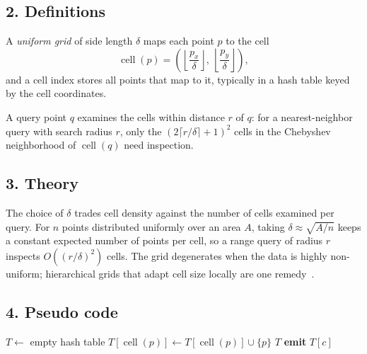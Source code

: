 \subsection{2. Definitions}

\begin{definition}\label{def:uniform_grid}
A \emph{uniform grid} of side length $\delta$ maps each point $p$ to the cell
\[
\operatorname{cell}(p) = \left( \left\lfloor \frac{p_x}{\delta} \right\rfloor,\ \left\lfloor \frac{p_y}{\delta} \right\rfloor \right),
\]
and a cell index stores all points that map to it, typically in a hash table keyed by the cell coordinates.
\end{definition}

\begin{definition}\label{def:grid_query_neighborhood}
A query point $q$ examines the cells within distance $r$ of $q$: for a nearest-neighbor query with search radius $r$, only the $(2\lceil r/\delta \rceil + 1)^2$ cells in the Chebyshev neighborhood of $\operatorname{cell}(q)$ need inspection.
\end{definition}

\subsection{3. Theory}
The choice of $\delta$ trades cell density against the number of cells examined per query. For $n$ points distributed uniformly over an area $A$, taking $\delta \approx \sqrt{A/n}$ keeps a constant expected number of points per cell, so a range query of radius $r$ inspects $O((r/\delta)^2)$ cells. The grid degenerates when the data is highly non-uniform; hierarchical grids that adapt cell size locally are one remedy~\cite{berg2008}.

\subsection{4. Pseudo code}
\begin{algorithmic}
    \State $T \gets$ empty hash table
        \State $T[\operatorname{cell}(p)] \gets T[\operatorname{cell}(p)] \cup \{p\}$
    \EndFor
    \State \Return $T$
\EndFunction
{}
        \State \textbf{emit} $T[c]$
    \EndFor
\EndFunction
\end{algorithmic}

